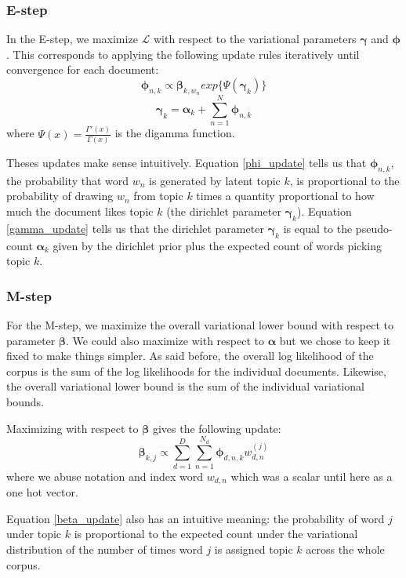 \documentclass{article}
\begin{document}
\subsubsection{E-step}
In the E-step, we maximize $\mathcal{L}$ with respect to the variational parameters $\bm{\gamma}$ and $\bm{\phi}$. This corresponds to applying the following update rules iteratively until convergence for each document:
\begin{equation} 
\label{phi_update}
\bm{\phi}_{n,k} \propto \bm{\beta}_{k, w_n} exp\{\Psi(\bm{\gamma}_k)\}
\end{equation}
\begin{equation}
\label{gamma_update}
\bm{\gamma}_{k} = \bm{\alpha}_{k} + \sum_{n=1}^N \bm{\phi}_{n,k}
\end{equation}
where $\Psi(x) = \frac{\Gamma'(x)}{\Gamma(x)}$ is the digamma function.

Theses updates make sense intuitively. Equation \ref{phi_update} tells us that $\bm{\phi}_{n,k}$, the probability that word $w_n$ is generated by latent topic $k$, is proportional to the probability of drawing $w_n$ from topic $k$ times a quantity proportional to how much the document likes topic $k$ (the dirichlet parameter $\bm{\gamma}_k$). Equation \ref{gamma_update} tells us that the dirichlet parameter $\bm{\gamma}_k$ is equal to the pseudo-count $\bm{\alpha}_k$ given by the dirichlet prior plus the expected count of words picking topic $k$.

\subsubsection{M-step}
For the M-step, we maximize the overall variational lower bound with respect to parameter $\bm{\beta}$. We could also maximize with respect to $\bm{\alpha}$ but we chose to keep it fixed to make things simpler. As said before, the overall log likelihood of the corpus is the sum of the log likelihoods for the individual documents. Likewise, the overall variational lower bound is the sum of the individual variational bounds. 

Maximizing with respect to $\bm{\beta}$ gives the following update:
\begin{equation} 
\label{beta_update}
\bm{\beta}_{k,j} \propto \sum_{d=1}^D \sum_{n=1}^{N_d} \bm{\phi}_{d, n, k}
w_{d,n}^{(j)}
\end{equation}
where we abuse notation and index word $w_{d,n}$ which was a scalar until here as a one hot vector.

Equation \ref{beta_update} also has an intuitive meaning: the probability of word $j$ under topic $k$ is proportional to the expected count under the variational distribution of the number of times word $j$ is assigned topic $k$ across the whole corpus.
\end{document}
